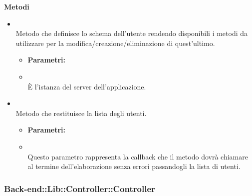 		\textbf{Metodi} 
	\begin{itemize}
					\item[] \textbf{} \\ Metodo che definisce lo schema  dell'utente rendendo disponibili i metodi da utilizzare per la modifica/creazione/eliminazione di quest'ultimo.
						\begin{itemize}\addtolength{\itemsep}{-0.5\baselineskip}
						\item[] \textbf{Parametri:}
						\item[]  \\ È l'istanza del server dell'applicazione.	
				\end{itemize}
					\item[] \textbf{} \\ Metodo che restituisce la lista degli utenti.
						\begin{itemize}\addtolength{\itemsep}{-0.5\baselineskip}
						\item[] \textbf{Parametri:}
						\item[]  \\ Questo parametro rappresenta la callback che il metodo dovrà chiamare al termine dell'elaborazione senza errori passandogli la lista di utenti.	
				\end{itemize}
		\end{itemize}
	\subsubsection{Back-end::Lib::Controller::Controller} 
